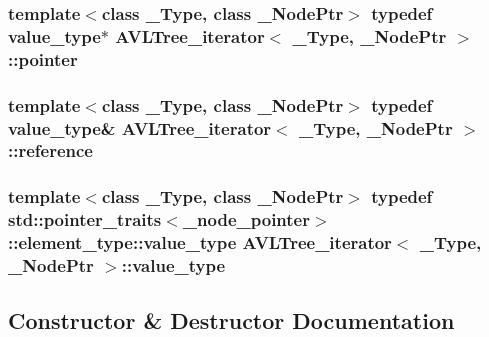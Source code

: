 \subsubsection[{pointer}]{\setlength{\rightskip}{0pt plus 5cm}template$<$class \+\_\+\+Type, class \+\_\+\+Node\+Ptr$>$ typedef {\bf value\+\_\+type}$\ast$ {\bf A\+V\+L\+Tree\+\_\+iterator}$<$ \+\_\+\+Type, \+\_\+\+Node\+Ptr $>$\+::{\bf pointer}}\label{class_a_v_l_tree__iterator_ab3060d2f8d96febec03250b59b9d6c5b}
\hypertarget{class_a_v_l_tree__iterator_a67cbb11da40a9e4a517bb9a082590d5a}{}
\subsubsection[{reference}]{\setlength{\rightskip}{0pt plus 5cm}template$<$class \+\_\+\+Type, class \+\_\+\+Node\+Ptr$>$ typedef {\bf value\+\_\+type}\& {\bf A\+V\+L\+Tree\+\_\+iterator}$<$ \+\_\+\+Type, \+\_\+\+Node\+Ptr $>$\+::{\bf reference}}\label{class_a_v_l_tree__iterator_a67cbb11da40a9e4a517bb9a082590d5a}
\hypertarget{class_a_v_l_tree__iterator_adad51d3a8cc80149c12d9eb311f979fc}{}
\subsubsection[{value\+\_\+type}]{\setlength{\rightskip}{0pt plus 5cm}template$<$class \+\_\+\+Type, class \+\_\+\+Node\+Ptr$>$ typedef std\+::pointer\+\_\+traits$<$\+\_\+node\+\_\+pointer$>$\+::element\+\_\+type\+::value\+\_\+type {\bf A\+V\+L\+Tree\+\_\+iterator}$<$ \+\_\+\+Type, \+\_\+\+Node\+Ptr $>$\+::{\bf value\+\_\+type}}\label{class_a_v_l_tree__iterator_adad51d3a8cc80149c12d9eb311f979fc}


\subsection{Constructor \& Destructor Documentation}
\hypertarget{class_a_v_l_tree__iterator_af2b909a226f39060ee9b27159329891c}{}
